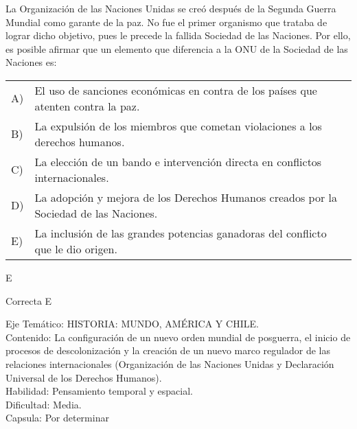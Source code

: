 \documentclass[letterpaper,11pt]{article}
\newcommand{\anchopregunta}{0.9\textwidth}
\begin{document}
\begin{enumerate}
\begin{minipage}{\anchopregunta}
\item La Organización de las Naciones Unidas se creó después de la Segunda Guerra Mundial como garante de la paz. No fue el primer organismo que trataba de lograr dicho objetivo, pues le precede la fallida Sociedad de las Naciones. Por ello, es posible afirmar que un elemento que diferencia a la ONU de la Sociedad de las Naciones es:
\begin{flushleft}\begin{tabular}{@{\hspace{-.001\textwidth}}l@{\hspace{2pt}}p{}}
A)& El uso de sanciones económicas en contra de los países que atenten contra la paz.\\
B)& La expulsión de los miembros que cometan violaciones a los derechos humanos.\\
C)& La elección de un bando e intervención directa en conflictos internacionales.\\
D)& La adopción y mejora de los Derechos Humanos creados por la Sociedad de las Naciones.\\
E)& La inclusión de las grandes potencias ganadoras del conflicto que le dio origen.\\ 
\end{tabular}\end{flushleft}%
\begin{key} E
\end{key} 
\begin{hint}
\end{hint}
\begin{answer} Correcta E \\
\end{answer}
\begin{info} %
\begin{flushleft}
Eje Temático: HISTORIA: MUNDO, AMÉRICA Y CHILE.\\
Contenido: La configuración de un nuevo orden mundial de posguerra, el inicio de procesos de descolonización y la creación de un nuevo marco regulador de las relaciones internacionales (Organización de las Naciones Unidas y Declaración Universal de los Derechos Humanos).\\
Habilidad: Pensamiento temporal y espacial.\\
Dificultad: Media.\\
Capsula: Por determinar \\
\end{flushleft} 
\end{info}
\end{minipage}\vfill$\;$ %


\end{enumerate}
\end{document}
